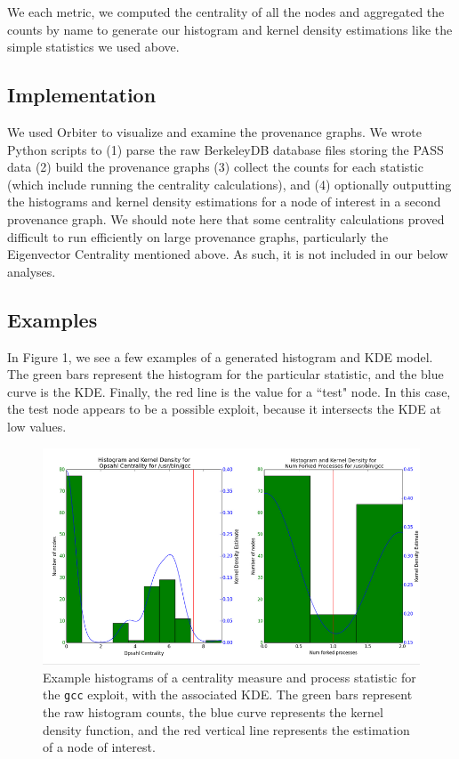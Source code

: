 \documentclass[10pt,twocolumn]{article}
\begin{document}
We each metric, we computed the centrality of all the nodes and aggregated the counts by name to generate our histogram and kernel density estimations like the simple statistics we used above.

\subsection{Implementation}
We used Orbiter \cite{orbiter} to visualize and examine the provenance graphs. We wrote Python scripts to (1) parse the raw BerkeleyDB database files storing the PASS data (2) build the provenance graphs (3) collect the counts for each statistic (which include running the centrality calculations), and (4) optionally outputting the histograms and kernel density estimations for a node of interest in a second provenance graph. We should note here that some centrality calculations proved difficult to run efficiently on large provenance graphs, particularly the Eigenvector Centrality mentioned above. As such, it is not included in our below analyses. 

\subsection{Examples}
In Figure 1, we see a few examples of a generated histogram and KDE model. The green bars represent the histogram for the particular statistic, and the blue curve is the KDE. Finally, the red line is the value for a ``test" node. In this case, the test node appears to be a possible exploit, because it intersects the KDE at low values. 
\begin{figure}
  \label{kde-example}
  \caption{Example histograms of a centrality measure and process statistic for the \texttt{gcc} exploit, with the associated KDE. The green bars represent the raw histogram counts, the blue curve represents the kernel density function, and the red vertical line represents the estimation of a node of interest.}
  \centering
    \includegraphics[width=\textwidth]{img/hist.png}
\end{figure}
\end{document}
